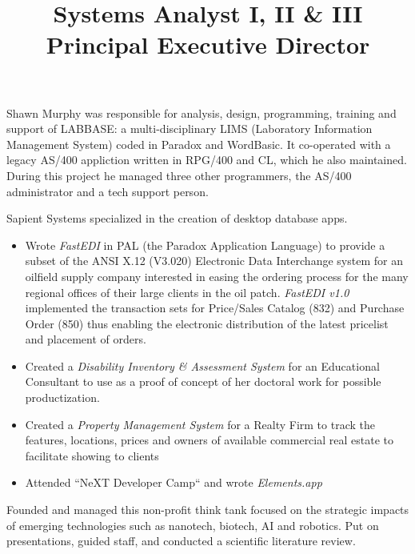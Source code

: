 \documentclass[line,margin,hidelinks]{res}
\begin{document}
\begin{resume}
\begin{position}
\end{position}



\title{Systems Analyst I, II \& III}
\begin{position}
  Shawn Murphy was responsible for analysis, design, programming,
  training and support of LABBASE: a multi-disciplinary LIMS
  (Laboratory Information Management System) coded in Paradox and
  WordBasic.  It co-operated with a legacy AS/400 appliction written
  in RPG/400 and CL, which he also maintained.  During this project he
  managed three other programmers, the AS/400 administrator and a tech
  support person.
\end{position}


\title{ Principal }
\begin{position}
Sapient Systems specialized in the creation of desktop database apps.
\begin{itemize}
\item Wrote {\it FastEDI} in PAL (the Paradox Application Language)  to
	provide a subset of the
	ANSI X.12 (V3.020) Electronic Data Interchange system for an
	oilfield supply company interested in easing the ordering process for
	the many regional offices of their large clients in the oil patch.
	{\it FastEDI v1.0} implemented
	the transaction sets for Price/Sales Catalog (832) and
	Purchase Order (850) thus enabling the electronic distribution
	of the latest pricelist and placement of orders.
\item Created a {\it Disability Inventory \& Assessment System }
	for an Educational Consultant to use as a proof of concept of
	her doctoral work for possible productization.
\item Created a {\it Property Management System} for a Realty Firm to
	track the features, locations, prices and owners of
	available commercial real estate to facilitate showing to clients
\item Attended ``NeXT Developer Camp`` and wrote \emph{Elements.app}
\end{itemize}
\end{position}


\title{ Executive Director }
\begin{position}
  Founded and managed this non-profit think tank focused on the strategic impacts of
  emerging technologies such as nanotech, biotech, AI and robotics.
  Put on presentations, guided staff, and conducted a scientific literature review.
\end{position}



\end{resume}
\end{document}
